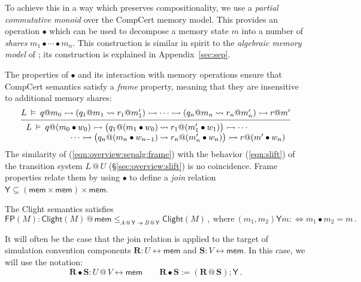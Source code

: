 \documentclass[acmsmall,screen,review,anonymous]{acmart}
\newcommand{\kw}[1]{\ensuremath{ \mathsf{#1} }}
\newcommand{\jr}{\mathsf{Y}}
\begin{document}
To achieve this in a way which preserves compositionality,
we use a \emph{partial commutative monoid}
over the CompCert memory model.
This provides an operation $\bullet$
which can be used to decompose a memory state $m$ into
a number of \emph{shares}
$
  m_1 \bullet \cdots \bullet m_n
$.
This construction
is similar in spirit to the \emph{algebraic memory model}
of \citet{ccal};
its construction is explained in Appendix~\ref{sec:sep}.

The properties of $\bullet$
and its interaction with memory operations
ensure that CompCert semantics satisfy
a \emph{frame} property,
meaning that they are insensitive to
additional memory shares:
\begin{equation} \label{eqn:overview:sepalg:frame}
  \begin{prooftree}
  \hypo{
  L \:\vDash\: q@m_0 \rightarrowtail
    (q_1@m_1 \leadsto r_1@m_1') \rightarrowtail
    \cdots \rightarrowtail
    (q_n@m_n \leadsto r_n@m_n') \rightarrowtail
    r@m'}
  \infer1{
   {\begin{array}{r@{\:}l}
    L \:\vDash\: q@(m_0 \bullet w_0) \rightarrowtail
      \big( q_1@(m_1 \bullet w_0) &\leadsto r_1@(m_1' \bullet w_1) \big) \rightarrowtail
      \cdots \\ \cdots \rightarrowtail
      \big( q_n@(m_n \bullet w_{n-1}) &\leadsto r_n@(m_n' \bullet w_n) \big) \rightarrowtail
      r@(m' \bullet w_n)
   \end{array}} }
  \end{prooftree}
\end{equation}
The similarity of (\ref{eqn:overview:sepalg:frame})
with the behavior (\ref{eqn:slift})
of the transition system $L \mathbin@ U$ (\S\ref{sec:overview:slift})
is no coincidence.
Frame properties relate them by using
$\bullet$ to define a \emph{join} relation
$\jr \subseteq (\kw{mem} \times \kw{mem}) \times \kw{mem}$.

\begin{theorem} \label{thm:clightframe}
The Clight semantics satisfies
\[
  \kw{FP}(M) :
  \kw{Clight}(M) \mathbin@ \kw{mem}
  \le_{A \mathbin@ \jr \twoheadrightarrow B \mathbin@ \jr}
  \kw{Clight}(M)
  \,,
  \: \text{where} \:
  (m_1, m_2) \mathrel{\jr} m  :\Leftrightarrow
  m_1 \bullet m_2 = m
  \,.
\]
\end{theorem}

It will often be the case that the join relation
is applied to the target of
simulation convention components
$\mathbf{R} : U \leftrightarrow \kw{mem}$ and
$\mathbf{S} : V \leftrightarrow \kw{mem}$.
In this case,
we will use the notation:
\[
  \mathbf{R} \bullet \mathbf{S} : U \mathbin@ V \leftrightarrow \kw{mem}
  \qquad
  \mathbf{R} \bullet \mathbf{S} :=
  (\mathbf{R} \mathbin@ \mathbf{S}) \mathbin; \jr
  \,.
\]
\end{document}
